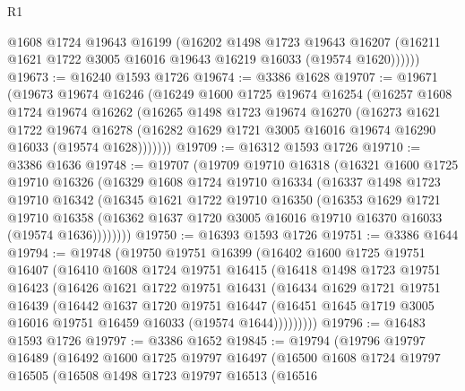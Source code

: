 \begin{lexlean}{R1}
\begin{coremodule}
          @1608
          @1724
          @19643
          @16199
          (@16202
            @1498
            @1723
            @19643
            @16207
            (@16211 @1621 @1722 @3005 @16016 @19643 @16219 @16033 (@19574 @1620))))))
@19673 := @16240 @1593 @1726
@19674 := @3386 @1628
@19707 := @19671
    (@19673
      @19674
      @16246
      (@16249
        @1600
        @1725
        @19674
        @16254
        (@16257
          @1608
          @1724
          @19674
          @16262
          (@16265
            @1498
            @1723
            @19674
            @16270
            (@16273
              @1621
              @1722
              @19674
              @16278
              (@16282 @1629 @1721 @3005 @16016 @19674 @16290 @16033 (@19574 @1628)))))))
@19709 := @16312 @1593 @1726
@19710 := @3386 @1636
@19748 := @19707
    (@19709
      @19710
      @16318
      (@16321
        @1600
        @1725
        @19710
        @16326
        (@16329
          @1608
          @1724
          @19710
          @16334
          (@16337
            @1498
            @1723
            @19710
            @16342
            (@16345
              @1621
              @1722
              @19710
              @16350
              (@16353
                @1629
                @1721
                @19710
                @16358
                (@16362 @1637 @1720 @3005 @16016 @19710 @16370 @16033 (@19574 @1636))))))))
@19750 := @16393 @1593 @1726
@19751 := @3386 @1644
@19794 := @19748
    (@19750
      @19751
      @16399
      (@16402
        @1600
        @1725
        @19751
        @16407
        (@16410
          @1608
          @1724
          @19751
          @16415
          (@16418
            @1498
            @1723
            @19751
            @16423
            (@16426
              @1621
              @1722
              @19751
              @16431
              (@16434
                @1629
                @1721
                @19751
                @16439
                (@16442
                  @1637
                  @1720
                  @19751
                  @16447
                  (@16451 @1645 @1719 @3005 @16016 @19751 @16459 @16033 (@19574 @1644)))))))))
@19796 := @16483 @1593 @1726
@19797 := @3386 @1652
@19845 := @19794
    (@19796
      @19797
      @16489
      (@16492
        @1600
        @1725
        @19797
        @16497
        (@16500
          @1608
          @1724
          @19797
          @16505
          (@16508
            @1498
            @1723
            @19797
            @16513
            (@16516

\end{coremodule}
\end{lexlean}
